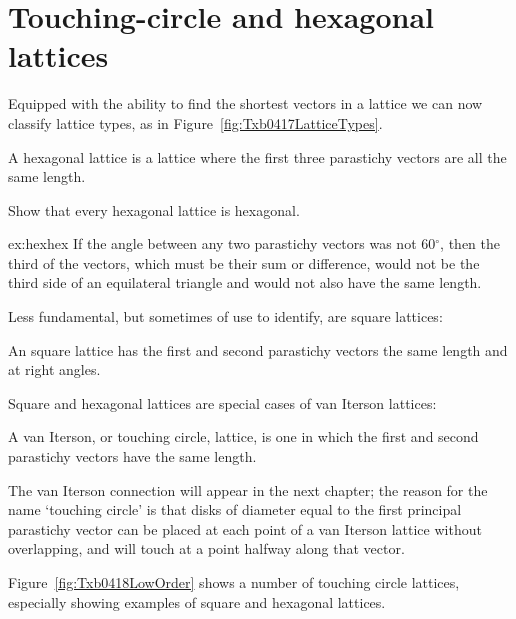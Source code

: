 \section{Touching-circle and hexagonal lattices}
\label{sec:hexdef}
Equipped with the ability to find the shortest vectors in a lattice we can now classify lattice types, as in Figure~\ref{fig:Txb0417LatticeTypes}.
\begin{definition}
	A hexagonal lattice is a lattice where the first three parastichy vectors are all the same length. 
\end{definition}
\begin{jExercise}\label{ex:hexhex}
	Show that every hexagonal lattice is hexagonal.
\end{jExercise}
\begin{jAnswer}{ex:hexhex}{
	If the angle between any two parastichy vectors was not 60$^\circ$, then the third of the vectors, which must be their sum or difference, would not be the third side of an equilateral triangle and would not also have the same length.
}\end{jAnswer}
Less fundamental, but sometimes of use to identify, are square lattices:
\begin{definition}
	An square lattice has the first and second parastichy vectors the same length and at right angles. 
\end{definition}
Square and hexagonal lattices are special cases of van Iterson lattices:
\begin{definition}
	A van Iterson, or touching circle, lattice, is one in which the first and second parastichy vectors have the same length.
\end{definition}
The van Iterson connection will appear in the next chapter; the reason for the name `touching circle' is that disks of diameter equal to the first principal parastichy vector can be placed at each point of a van Iterson lattice without overlapping, and will touch at a point halfway along that vector. 


Figure~\ref{fig:Txb0418LowOrder} shows a number of touching circle lattices, especially showing examples of square and hexagonal lattices. 
%

